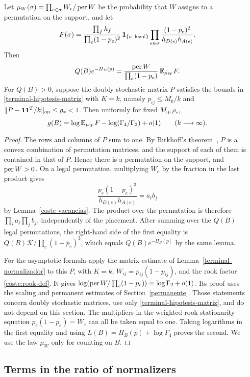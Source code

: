 \begin{lema}\label{coste-factor}
Let $\mu_W(\sigma)=\prod_{e\in\sigma}W_e/\operatorname{per} W$ be the probability that $W$ assigns to a
permutation on the support, and let
\[
 F(\sigma)=
 \frac{\prod_f h_f}{\prod_e(1-p_e)^2}\,
 \mathbf1_{\{\sigma\ {\rm legal}\}}
 \prod_{e\in\sigma}\frac{(1-p_e)^2}{h_{D(e)}h_{A(e)}} .
\]
Then
\[
 Q(B)e^{-H_B(p)}
   =\frac{\operatorname{per} W}{\prod_e(1-p_e)}\,\mathbb{E}_{\mu_W}F.
\]
For $Q(B)>0$, suppose the doubly stochastic matrix $P$ satisfies the bounds
in \eqref{terminal-hipotesis-matriz} with $K=k$, namely $p_{ij}\le M_0/k$ and
$\|P-\mathbf1\mathbf1^T/k\|_{\rm op}\le\rho_*<1$. Then uniformly for fixed $M_0,\rho_*$,
\[
 g(B)=\log\mathbb{E}_{\mu_W}F-\log(\Gamma_4/\Gamma_2)+o(1)
 \qquad (k\longrightarrow\infty).
\]
\end{lema}
\begin{proof}
The rows and columns of $P$ sum to one. By Birkhoff's theorem~\cite{birkhoff}, $P$ is a convex
combination of permutation matrices, and the support of each of them is contained in that of $P$.
Hence there is a permutation on the support, and $\operatorname{per} W>0$. On a legal permutation, multiplying $W_e$ by
the fraction in the last product gives
\[
 \frac{p_e(1-p_e)^3}{h_{D(e)}h_{A(e)}}=a_i b_j
\]
by Lemma~\ref{coste-vacancias}. The product over the permutation is therefore $\prod_i a_i\prod_j b_j$,
independently of the placement. After summing over the $Q(B)$ legal permutations, the right-hand
side of the first equality is $Q(B)\mathcal K/\prod_e(1-p_e)^3$, which equals $Q(B)e^{-H_B(p)}$
by the same lemma.

For the asymptotic formula apply the matrix estimate of Lemma~\ref{terminal-normalizador} to this
$P$, with $K=k$, $W_{ij}=p_{ij}(1-p_{ij})$, and the rook factor \eqref{coste:rook-def}. It gives
$\log(\operatorname{per} W/\prod_e(1-p_e))=\log\Gamma_2+o(1)$. Its proof uses the scaling and permanent
estimates of Section~\ref{permanente}. Those statements concern doubly stochastic matrices, use only
\eqref{terminal-hipotesis-matriz}, and do not depend on this section. The multipliers in the weighted
rook stationarity equation
$p_e(1-p_e)=W_e$ can all be taken equal to one. Taking logarithms in the first equality and using
$L(B)=H_B(p)+\log\Gamma_4$ proves the second. We use the law $\mu_W$ only for counting on $B$.
\end{proof}

\subsection{Terms in the ratio of normalizers}

